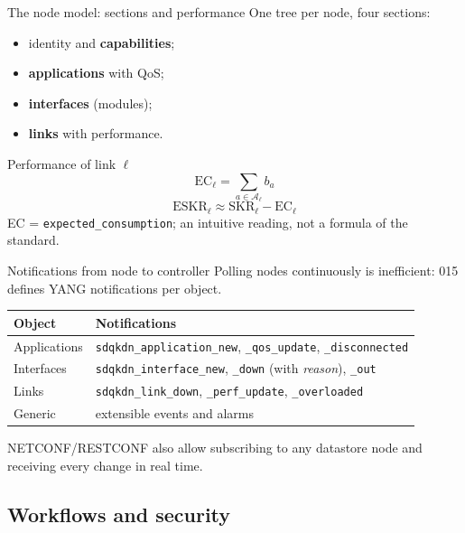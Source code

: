 \documentclass[10pt]{beamer}
\begin{document}
\begin{frame}{The node model: sections and performance}
      \small
      One tree per node, four sections:
      \begin{itemize}
        \item identity and \textbf{capabilities};
        \item \textbf{applications} with QoS;
        \item \textbf{interfaces} (modules);
        \item \textbf{links} with performance.
      \end{itemize}
      \begin{block}{Performance of link $\ell$}
        \[
          \mathrm{EC}_\ell = \sum_{a\in\mathcal{A}_\ell} b_a
        \]
        \[
          \mathrm{ESKR}_\ell \approx \mathrm{SKR}_\ell - \mathrm{EC}_\ell
        \]
        {\footnotesize EC = \texttt{expected\_consumption}; an intuitive reading,
        not a formula of the standard.}
      \end{block}
\end{frame}

\begin{frame}{Notifications from node to controller}
  Polling nodes continuously is inefficient: 015 defines YANG
  notifications per object.
  \vspace{1ex}
  \small
  \begin{tabularx}{\textwidth}{@{}l L@{}}
    \toprule
    \textbf{Object} & \textbf{Notifications} \\
    \midrule
    Applications & \texttt{sdqkdn\_application\_new}, \texttt{\_qos\_update}, \texttt{\_disconnected} \\
    Interfaces & \texttt{sdqkdn\_interface\_new}, \texttt{\_down} (with \emph{reason}), \texttt{\_out} \\
    Links & \texttt{sdqkdn\_link\_down}, \texttt{\_perf\_update}, \texttt{\_overloaded} \\
    Generic & extensible events and alarms \\
    \bottomrule
  \end{tabularx}
  \vspace{2ex}

  NETCONF/RESTCONF also allow subscribing to any datastore node and
  receiving every change in real time.
\end{frame}

\subsection{Workflows and security}
\end{document}
